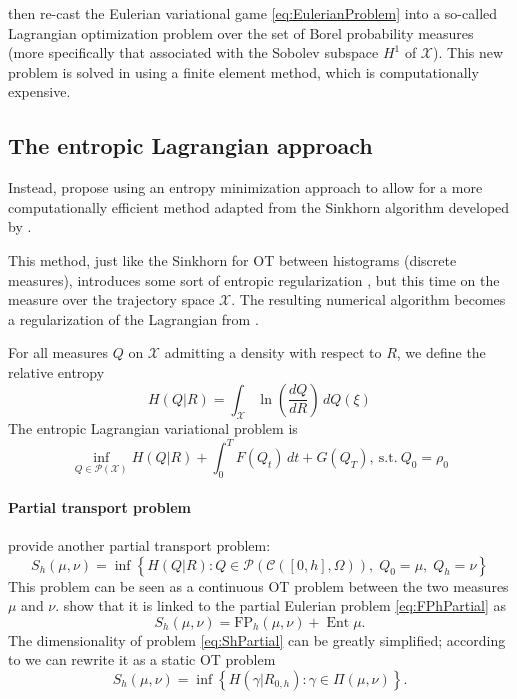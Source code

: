 \documentclass{article}
\newcommand{\calC}{\mathcal{C}}
\newcommand{\calP}{\mathcal{P}}
\newcommand{\calX}{\mathcal{X}}
\newcommand{\suchthat}{\mathrm{s.t.}}
\DeclareMathOperator{\Ent}{Ent}
\begin{document}
    \textcite{benamou:hal-01295299,benamou2015lagrangian} then re-cast the Eulerian variational game \eqref{eq:EulerianProblem} into a so-called Lagrangian optimization problem over the set of Borel probability measures (more specifically that associated with the Sobolev subspace $H^1$ of $\calX$). This new problem is solved in \cite{benamou:hal-01295299} using a finite element method, which is computationally expensive.
    
    
    
    
    \subsection{The entropic Lagrangian approach}
    
    Instead, \textcite{benamou2018entropy} propose using an entropy minimization approach to allow for a more computationally efficient method adapted from the Sinkhorn algorithm \cite{cuturi2013sinkhorn} developed by \citeauthor{cuturi2013sinkhorn}.
    
    This method, just like the Sinkhorn for OT between histograms (discrete measures), introduces some sort of entropic regularization \cite{benamou2018entropy}, but this time on the measure over the trajectory space $\calX$. The resulting numerical algorithm becomes a regularization of the Lagrangian from \cite{benamou:hal-01295299,benamou2015lagrangian}.
    
    For all measures $Q$ on $\calX$ admitting a density with respect to $R$, we define the relative entropy
    \begin{equation}\label{eq:VariationalEntropy}
   	H(Q | R) = \int_\calX \ln\left(\frac{dQ}{dR}\right)\,dQ(\xi)
    \end{equation}
    The entropic Lagrangian variational problem is
    \begin{equation}\label{eq:EntropyLagrangianPb}
    \inf_{Q\in\calP(\calX)}
    H(Q|R) + \int_0^T F(Q_t)\,dt + G(Q_T),\
    \suchthat\ Q_0 = \rho_0
    \end{equation}
    
    \paragraph{Partial transport problem} \citeauthor{benamou2018entropy} provide another partial transport problem:
    \begin{equation}\label{eq:ShPartial}
    	S_h(\mu, \nu) =
    	\inf\left\{
    		H(Q|R) : Q\in\calP(\calC([0,h], \Omega)),
    		\; Q_0 = \mu,\; Q_h = \nu
    	\right\}
    \end{equation}
    This problem can be seen as a continuous OT problem between the two measures $\mu$ and $\nu$. \textcite{benamou2018entropy} show that it is linked to the partial Eulerian problem \eqref{eq:FPhPartial} as
    \[
    	S_h(\mu,\nu) = \mathrm{FP}_h(\mu,\nu) + \Ent \mu.
    \]
    The dimensionality of problem \eqref{eq:ShPartial} can be greatly simplified; according to \cite{benamou2018entropy} we can rewrite it as a static OT problem
    \begin{equation}
    	S_h(\mu, \nu) = \inf\left\{ H(\gamma | R_{0,h}) : \gamma \in \Pi(\mu, \nu) \right\}.
    \end{equation}
    
\end{document}
